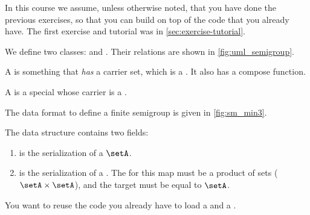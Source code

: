 
\begin{remark}
	In this course we assume, unless otherwise noted, that you have done the previous exercises, so that you can build on top of the code that you already have.
	The first exercise and tutorial was in \cref{sec:exercise-tutorial}.
\end{remark}

\begin{figure*}[b]
	\label{fig:uml_semigroup}
\end{figure*}

We define two classes: \Semigroup and \FiniteSemigroup.
Their relations are shown in \cref{fig:uml_semigroup}.

A \Semigroup is something that \emph{has} a carrier set, which is a \Setoid.
It also has a compose function.


A \FiniteSemigroup is a special \Semigroup whose carrier is a \FiniteSet.


\begin{marginfigure}%
	\caption{}%
	\label{fig:sm_min3}%
\end{marginfigure}%

The data format to define a finite semigroup is given in \cref{fig:sm_min3}.

The data structure contains two fields:
\begin{enumerate}
	\item {} is the serialization of a \FiniteSet $\setA$.
	\item {} is the serialization of a \FiniteMap.
	      The  for this map must be a product of sets ($\setA \times \setA$), and the target must be equal to $\setA$.
\end{enumerate}



\begin{hint}
	You want to reuse the code you already have to load a \FiniteSet and a \FiniteMap.
\end{hint}

\label{sec:free-semigroup}


